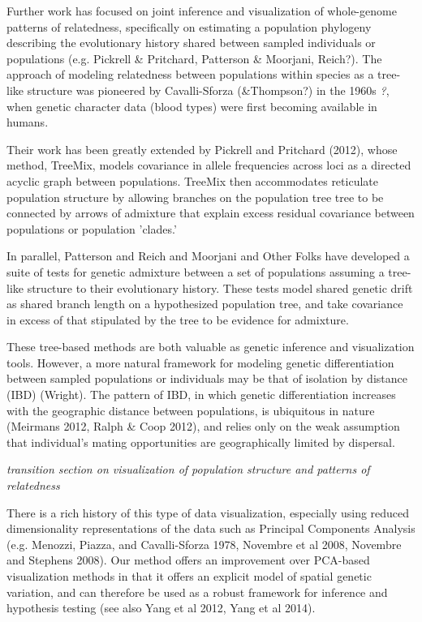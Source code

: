 \documentclass[12pt]{article}
\newcommand{\gb}[1]{{\em \color{magenta} #1}}
\begin{document}
Further work has focused on joint inference and visualization of whole-genome patterns of relatedness, specifically on estimating a population phylogeny describing the evolutionary history shared between sampled individuals or populations (e.g. Pickrell \& Pritchard, Patterson \& Moorjani, Reich?).  The approach of modeling relatedness between populations within species as a tree-like structure was pioneered by Cavalli-Sforza (\&Thompson?) in the 1960s \gb{?}, when genetic character data (blood types) were first becoming available in humans.  

Their work has been greatly extended by Pickrell and Pritchard (2012), whose method, TreeMix, models covariance in allele frequencies across loci as a directed acyclic graph between populations.  TreeMix then accommodates reticulate population structure by allowing branches on the population tree tree to be connected by arrows of admixture that explain excess residual covariance between populations or population 'clades.' 

In parallel, Patterson and Reich and Moorjani and Other Folks have developed a suite of tests for genetic admixture between a set of populations assuming a tree-like structure to their evolutionary history.  These tests model shared genetic drift as shared branch length on a hypothesized population tree, and take covariance in excess of that stipulated by the tree to be evidence for admixture.

These tree-based methods are both valuable as genetic inference and visualization tools.  However, a more natural framework for modeling genetic differentiation between sampled populations or individuals may be that of isolation by distance (IBD) (Wright).  The pattern of IBD, in which genetic differentiation increases with the geographic distance between populations, is ubiquitous in nature (Meirmans 2012, Ralph \& Coop 2012), and relies only on the weak assumption that individual's mating opportunities are geographically limited by dispersal.  

\gb{transition section on visualization of population structure and patterns of relatedness}

There is a rich history of this type of data visualization, especially using reduced dimensionality representations of the data such as Principal Components Analysis (e.g. Menozzi, Piazza, and Cavalli-Sforza 1978, Novembre et al 2008, Novembre and Stephens 2008).  Our method offers an improvement over PCA-based visualization methods in that it offers an explicit model of spatial genetic variation, and can therefore be used as a robust framework for inference and hypothesis testing (see also Yang et al 2012, Yang et al 2014).
\end{document}
